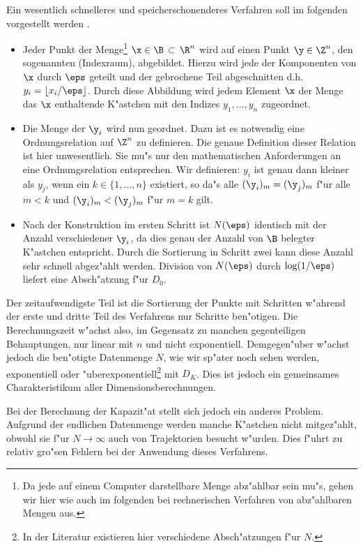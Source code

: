 Ein wesentlich schnelleres und speicherschonenderes Verfahren soll im folgenden
vorgestellt werden \cite{Junglas}.
\begin{itemize}
\item Jeder Punkt der Menge\footnote{Da jede auf einem
Computer darstellbare Menge abz"ahlbar sein mu"s, gehen wir hier wie auch im folgenden bei 
rechnerischen Verfahren von abz"ahlbaren Mengen aus.} $\x\in\B\,\subset\,\R^n$ wird auf einen
Punkt $\y\in\Z^n$, den sogenannten \begriff(Indexraum),  abgebildet. Hierzu wird jede
der Komponenten von $\x$ durch $\eps$ geteilt und der gebrochene Teil abgeschnitten
d.h.\  $y_i=\lfloor x_i/\eps \rfloor$. Durch diese Abbildung wird jedem Element $\x$ der
Menge das $\x$ enthaltende K"astchen mit den Indizes $y_1,\dots,y_n$ zugeordnet.
\item Die Menge der $\y_i$ wird nun geordnet. Dazu ist es notwendig eine Ordnungsrelation
auf $\Z^n$ zu definieren. Die genaue Definition dieser Relation ist hier unwesentlich. Sie mu"s nur den
mathematischen Anforderungen an eine Ordnungsrelation entsprechen. Wir definieren: $y_i$
ist genau dann kleiner als $y_j$, wenn ein $k\in\{1,\dots,n\}$ existiert, so da"s
alle $(\y_i)_m=(\y_j)_m$ f"ur alle $m<k$ und $(\y_i)_m<(\y_j)_m$ f"ur $m=k$ gilt.
\item Nach der Konstruktion im ersten Schritt ist $N(\eps)$ identisch mit der Anzahl
verschiedener $\y_i$, da dies genau der Anzahl von $\B$ belegter K"astchen
entspricht. Durch die Sortierung in Schritt zwei kann diese Anzahl sehr schnell abgez"ahlt 
werden. Division von $N(\eps)$ durch $\log(1/\eps)$ liefert eine Absch"atzung f"ur $D_0$.
\end{itemize}
Der zeitaufwendigste Teil ist die Sortierung der Punkte mit  Schritten
w"ahrend der erste und dritte Teil des Verfahrens nur  Schritte ben"otigen. 
Die Berechnungszeit w"achst also, im Gegensatz zu manchen gegenteiligen Behauptungen,
nur linear mit $n$ und nicht exponentiell. Demgegen"uber w"achst jedoch die
ben"otigte Datenmenge $N$, wie wir sp"ater noch sehen werden, exponentiell oder
"uberexponentiell\footnote{In der Literatur existieren hier verschiedene Absch"atzungen
f"ur $N$.} mit $D_K$. Dies ist jedoch ein gemeinsames Charakteristikum
aller Dimensionsberechnungen.

Bei der Berechnung der Kapazit"at stellt sich jedoch ein anderes Problem. Aufgrund der
endlichen Datenmenge werden manche K"astchen nicht mitgez"ahlt, obwohl sie f"ur
$N\to\infty$ auch von Trajektorien besucht w"urden. Dies f"uhrt zu relativ gro"sen Fehlern 
bei der Anwendung dieses Verfahrens. 

